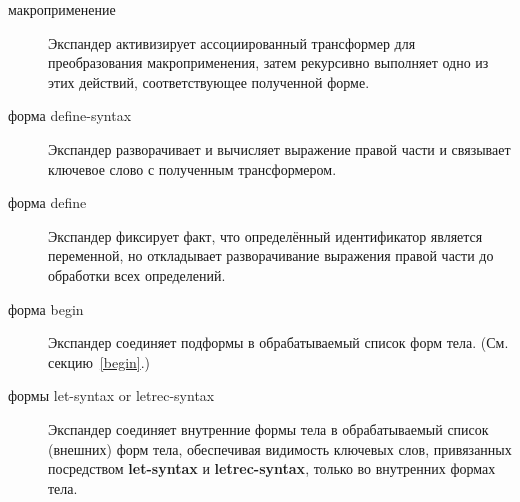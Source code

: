 \begin{description}
\item[макроприменение]
  Экспандер активизирует ассоциированный трансформер для преобразования макроприменения, затем
  рекурсивно выполняет одно из этих действий, соответствующее полученной форме.

\item[{\cf форма define-syntax}]
  Экспандер разворачивает и вычисляет выражение правой части и связывает ключевое слово
  с полученным трансформером.

\item[{\cf форма define}]
  Экспандер фиксирует факт, что определённый идентификатор является переменной, но
  откладывает разворачивание выражения правой части до обработки всех определений.

\item[{\cf форма begin}]
  Экспандер соединяет подформы в обрабатываемый список форм тела. (См. секцию~\ref{begin}.)

\item[{\cf формы let-syntax} or {\cf letrec-syntax}]
  Экспандер соединяет внутренние формы тела в обрабатываемый список (внешних) форм тела,
  обеспечивая видимость ключевых слов, привязанных посредством {\cf\bfseries let-syntax} и
  {\cf\bfseries letrec-syntax}, только во внутренних формах тела.



\end{description}
